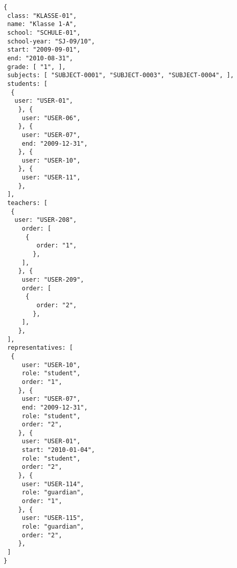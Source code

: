 
\begin{lstlisting}[caption={Klassen-Datenmodell
 Beispiel 2: Grundschulklasse},frame=tlrb]
{
 class: "KLASSE-01",
 name: "Klasse 1-A",
 school: "SCHULE-01",
 school-year: "SJ-09/10",
 start: "2009-09-01",
 end: "2010-08-31",
 grade: [ "1", ],
 subjects: [ "SUBJECT-0001", "SUBJECT-0003", "SUBJECT-0004", ],
 students: [
  { 
   user: "USER-01",
	}, { 
	 user: "USER-06",
	}, { 
	 user: "USER-07",
	 end: "2009-12-31",
	}, { 
	 user: "USER-10",
	}, { 
	 user: "USER-11",
	},
 ],
 teachers: [
  { 
   user: "USER-208",
	 order: [
	  {
		 order: "1",
		},
	 ],
	}, { 
	 user: "USER-209",
	 order: [
	  {
		 order: "2",
		},
	 ],
	},
 ],
 representatives: [
  {
	 user: "USER-10",
	 role: "student",
	 order: "1",	 
	}, {
	 user: "USER-07",
	 end: "2009-12-31",
	 role: "student",
	 order: "2",	 
	}, {
	 user: "USER-01",
	 start: "2010-01-04",
	 role: "student",
	 order: "2",	 
	}, {
	 user: "USER-114",
	 role: "guardian",
	 order: "1",	 
	}, {
	 user: "USER-115",
	 role: "guardian",
	 order: "2",	 
	},  
 ]
}
\end{lstlisting}
